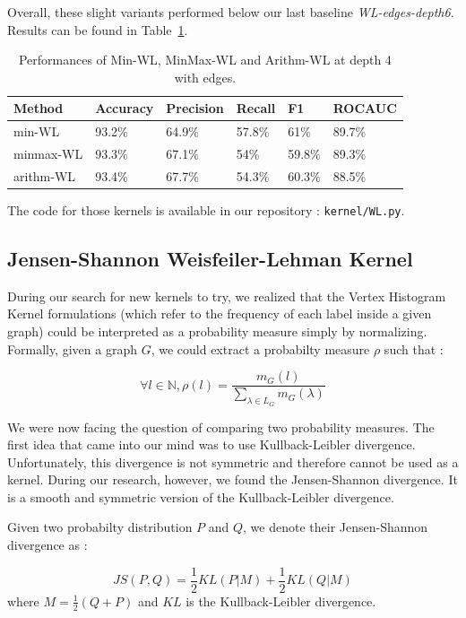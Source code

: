 \documentclass{IEEEtran}
\begin{document}
Overall, these slight variants performed below our last baseline \emph{WL-edges-depth6}.
Results can be found in Table~\ref{tab:method_comparison_depth4}.
\begin{table}[h]
    \centering
    \begin{tabular}{l|llll|l}
        Method    & Accuracy & Precision & Recall & F1     & ROCAUC \\
        \hline
        min-WL    & 93.2\%   & 64.9\%    & 57.8\% & 61\%   & 89.7\% \\
        minmax-WL & 93.3\%   & 67.1\%    & 54\%   & 59.8\% & 89.3\% \\
        arithm-WL & 93.4\%   & 67.7\%    & 54.3\% & 60.3\% & 88.5\% \\
    \end{tabular}
    \caption{Performances of Min-WL, MinMax-WL and Arithm-WL at depth 4 with edges.}
    \label{tab:method_comparison_depth4}
\end{table}

The code for those kernels is available in our repository : \texttt{kernel/WL.py}.

\subsection{Jensen-Shannon Weisfeiler-Lehman Kernel}

During our search for new kernels to try, we realized that the Vertex Histogram Kernel formulations (which refer to the frequency of each label inside a given graph) could be interpreted as a probability measure simply by normalizing.
Formally, given a graph $G$, we could extract a probabilty measure
$\rho$ such that :

\begin{equation*}
    \forall l \in \mathbb N, \rho (l) = \frac{m_G(l)}{\sum_{\lambda \in L_G}{m_G(\lambda)}}
\end{equation*}

We were now facing the question of comparing two probability measures. The first idea that came into our mind was to use Kullback-Leibler divergence. Unfortunately, this divergence is not symmetric and therefore cannot be used as a kernel. During our research, however, we found the Jensen-Shannon divergence. It is a smooth and symmetric version of the Kullback-Leibler divergence.

Given two probabilty distribution $P$ and $Q$, we denote their
Jensen-Shannon divergence as :

\begin{equation*}
    JS(P, Q) = \frac{1}{2}KL(P|M) + \frac{1}{2}KL(Q|M)
\end{equation*}
where $M = \frac{1}{2} \left( Q + P \right)$ and $KL$ is the Kullback-Leibler divergence.
\end{document}
